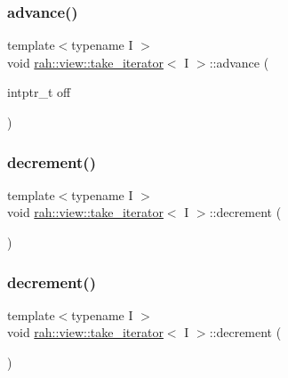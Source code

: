 \subsubsection{\texorpdfstring{advance()}{advance()}\hspace{0.1cm}{\footnotesize\ttfamily [2/2]}}
{\footnotesize\ttfamily template$<$typename I $>$ \\
void \mbox{\hyperlink{structrah_1_1view_1_1take__iterator}{rah\+::view\+::take\+\_\+iterator}}$<$ I $>$\+::advance (\begin{DoxyParamCaption}\item[{intptr\+\_\+t}]{off }\end{DoxyParamCaption})\hspace{0.3cm}{\ttfamily [inline]}}

\mbox{\label{structrah_1_1view_1_1take__iterator_a8f956fdfee282abbd88100533033d648}} 
\subsubsection{\texorpdfstring{decrement()}{decrement()}\hspace{0.1cm}{\footnotesize\ttfamily [1/2]}}
{\footnotesize\ttfamily template$<$typename I $>$ \\
void \mbox{\hyperlink{structrah_1_1view_1_1take__iterator}{rah\+::view\+::take\+\_\+iterator}}$<$ I $>$\+::decrement (\begin{DoxyParamCaption}{ }\end{DoxyParamCaption})\hspace{0.3cm}{\ttfamily [inline]}}

\mbox{\label{structrah_1_1view_1_1take__iterator_a8f956fdfee282abbd88100533033d648}} 
\subsubsection{\texorpdfstring{decrement()}{decrement()}\hspace{0.1cm}{\footnotesize\ttfamily [2/2]}}
{\footnotesize\ttfamily template$<$typename I $>$ \\
void \mbox{\hyperlink{structrah_1_1view_1_1take__iterator}{rah\+::view\+::take\+\_\+iterator}}$<$ I $>$\+::decrement (\begin{DoxyParamCaption}{ }\end{DoxyParamCaption})\hspace{0.3cm}{\ttfamily [inline]}}

